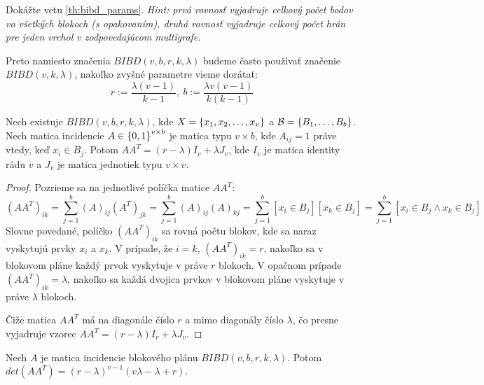 \begin{exercise}
Dokážte vetu \ref{th:bibd_params}. \emph{Hint: prvá rovnosť vyjadruje celkový počet bodov vo všetkých blokoch (s opakovaním), druhá rovnosť vyjadruje celkový počet hrán pre jeden vrchol v zodpovedajúcom multigrafe.}
\end{exercise}

\begin{corollary}
Preto namiesto značenia $BIBD(v, b, r, k, \lambda)$ budeme často
použivať značenie $BIBD(v, k, \lambda)$, nakoľko 
zvyšné parametre vieme dorátať: 
$$r := \dfrac{\lambda (v-1)}{k-1},~ b := \dfrac{\lambda v (v-1)}{k (k-1)}$$
\end{corollary}

\begin{theorem}

Nech existuje $BIBD(v, b,r, k, \lambda)$, kde $X = \left\{x_1, x_2, \ldots, x_v\right\}$ a $\mathcal{B} = \left\{B_1, \ldots, B_b\right\}$. 
Nech matica incidencie $A \in \left\{0, 1\right\}^{v \times b}$ je matica typu $v\times b$, kde $A_{ij} = 1$ práve vtedy, keď $x_i \in B_j$.
Potom $A A^T = (r-\lambda) I_v + \lambda J_{v}$, kde $I_v$ je matica identity rádu $v$ a $J_v$ je matica jednotiek typu $v \times v$.
\end{theorem}

\begin{proof}
Pozrieme sa na jednotlivé políčka matice $A A^T$:
\begin{equation*}
(AA^T)_{ik} = \sum_{j=1}^b (A)_{ij} (A^T)_{jk} = \sum_{j=1}^b (A)_{ij} (A)_{kj} = \sum_{j=1}^b [x_i \in B_j] [x_k \in B_j] = \sum_{j=1}^b [x_i \in B_j \wedge x_k \in B_j]
\end{equation*}
Slovne povedané, políčko $(AA^T)_{ik}$ sa rovná počtu blokov, kde sa naraz vyskytujú prvky $x_i$ a $x_k$.
V prípade, že $i = k$, $(AA^T)_{ik} = r$, nakoľko sa v blokovom pláne každý prvok vyskytuje v práve $r$ blokoch.
V opačnom prípade $(AA^T)_{ik} = \lambda$, nakoľko sa každá dvojica prvkov v blokovom pláne vyskytuje v práve $\lambda$ blokoch.

Čiže matica $AA^T$ má na diagonále číslo $r$ a mimo diagonály číslo $\lambda$, čo presne vyjadruje vzorec $A A^T = (r-\lambda) I_v + \lambda J_{v}$. 
\end{proof}


\begin{lemma}
\label{lem:aat_det}
Nech $A$ je matica incidencie blokového plánu $BIBD(v, b,r, k, \lambda)$. Potom $det(AA^T) = (r-\lambda)^{v-1} (v\lambda - \lambda + r)$.
\end{lemma}

